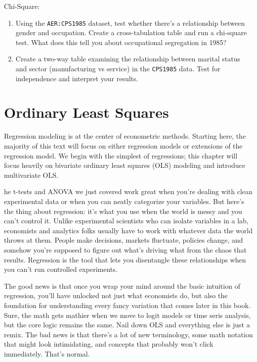 \documentclass[
  letterpaper,
]{book}
\begin{document}
Chi-Square:

\begin{enumerate}
\def\labelenumi{\arabic{enumi}.}
\setcounter{enumi}{6}
\item
  Using the \texttt{AER:CPS1985} dataset, test whether there's a
  relationship between gender and occupation. Create a cross-tabulation
  table and run a chi-square test. What does this tell you about
  occupational segregation in 1985?
\item
  Create a two-way table examining the relationship between marital
  status and sector (manufacturing vs service) in the \texttt{CPS1985}
  data. Test for independence and interpret your results.
\end{enumerate}


\chapter{Ordinary Least Squares}\label{sec-basicreg}

Regression modeling is at the center of econometric methods. Starting
here, the majority of this text will focus on either regression models
or extensions of the regression model. We begin with the simplest of
regressions; this chapter will focus heavily on bivariate ordinary least
squares (OLS) modeling and introduce multivariate OLS.

he t-tests and ANOVA we just covered work great when you're dealing with
clean experimental data or when you can neatly categorize your
variables. But here's the thing about regression: it's what you use when
the world is messy and you can't control it. Unlike experimental
scientists who can isolate variables in a lab, economists and analytics
folks usually have to work with whatever data the world throws at them.
People make decisions, markets fluctuate, policies change, and somehow
you're supposed to figure out what's driving what from the chaos that
results. Regression is the tool that lets you disentangle these
relationships when you can't run controlled experiments.

The good news is that once you wrap your mind around the basic intuition
of regression, you'll have unlocked not just what economists do, but
also the foundation for understanding every fancy variation that comes
later in this book. Sure, the math gets mathier when we move to logit
models or time seris analysis, but the core logic remains the same. Nail
down OLS and everything else is just a remix. The bad news is that
there's a lot of new terminology, some math notation that might look
intimidating, and concepts that probably won't click immediately. That's
normal.
\end{document}
